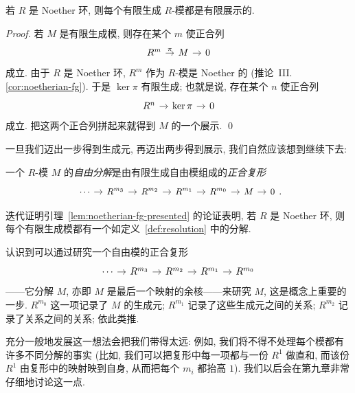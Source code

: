 \begin{lemma}\label{lem:noetherian-fg-presented}
若 $R$ 是 Noether 环, 则每个有限生成 $R$-模都是有限展示的.
\end{lemma}

\begin{proof}
若 $M$ 是有限生成模, 则存在某个 $m$ 使正合列
$$
\begin{tikzcd}[column sep=.9em]
R^m \ar[r,"\pi"] & M \ar[r] & 0
\end{tikzcd}
$$
成立. 由于 $R$ 是 Noether 环, $R^m$ 作为 $R$-模是 Noether 的 (推论~III.\ref{cor:noetherian-fg}). 于是 $\ker\pi$ 有限生成; 也就是说, 存在某个 $n$ 使正合列
$$
\begin{tikzcd}[column sep=.9em]
R^n \ar[r] & \ker\pi \ar[r] & 0
\end{tikzcd}
$$
成立. 把这两个正合列拼起来就得到 $M$ 的一个展示. \qed
\end{proof}

一旦我们迈出一步得到生成元, 再迈出两步得到展示, 我们自然应该想到继续下去:

\begin{definition}\label{def:resolution}
一个 $R$-模 $M$ 的\emph{自由分解}是由有限生成自由模组成的\emph{正合复形}
$$
\begin{tikzcd}[column sep=.9em,font=\small]
\cdots \ar[r] & R^{m_3} \ar[r] & R^{m_2} \ar[r] & R^{m_1} \ar[r] & R^{m_0} \ar[r] & M \ar[r] & 0
\end{tikzcd}.
$$
\end{definition}

迭代证明引理~\ref{lem:noetherian-fg-presented} 的论证表明, 若 $R$ 是 Noether 环, 则每个有限生成模都有一个如定义~\ref{def:resolution} 中的分解.

认识到可以通过研究一个自由模的正合复形
$$
\begin{tikzcd}[column sep=.9em]
\cdots \ar[r] & R^{m_3} \ar[r] & R^{m_2} \ar[r] & R^{m_1} \ar[r] & R^{m_0}
\end{tikzcd}
$$
——它分解 $M$, 亦即 $M$ 是最后一个映射的余核——来研究 $M$, 这是概念上重要的一步. $R^{m_0}$ 这一项记录了 $M$ 的生成元; $R^{m_1}$ 记录了这些生成元之间的关系; $R^{m_2}$ 记录了关系之间的关系; 依此类推.

充分一般地发展这一想法会把我们带得太远: 例如, 我们将不得不处理每个模都有许多不同分解的事实 (比如, 我们可以把复形中每一项都与一份 $R^1$ 做直和, 而该份 $R^1$ 由复形中的映射映到自身, 从而把每个 $m_i$ 都抬高 $1$). 我们以后会在第九章非常仔细地讨论这一点.

